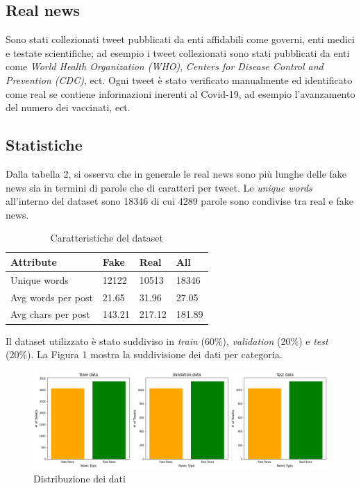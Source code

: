 \documentclass{article}
\begin{document}
\subsection{Real news}
Sono stati collezionati tweet pubblicati da enti affidabili come governi, enti medici e testate scientifiche; ad esempio i tweet collezionati sono stati pubblicati da enti come \textit{World Health Organization (WHO)}, \textit{Centers for Disease Control and Prevention (CDC)}, ect. Ogni tweet è stato verificato manualmente ed identificato come real se contiene informazioni inerenti al Covid-19, ad esempio l'avanzamento del numero dei vaccinati, ect.

\subsection{Statistiche}

Dalla tabella 2, si osserva che in generale le real news sono più lunghe delle fake news sia in termini di parole che di caratteri per tweet. Le \textit{unique words} all'interno del dataset sono 18346 di cui 4289 parole sono condivise tra real e fake news.

\begin{table}[h]
\begin{center}
\begin{tabular}{| l | l | l | l |}
\hline
\textbf{Attribute} & \textbf{Fake} & \textbf{Real}  & \textbf{All}  \\
\hline
Unique words & 12122 & 10513 & 18346 \\
\hline
Avg words per post & 21.65 & 31.96 & 27.05 \\
\hline
Avg chars per post & 143.21 & 217.12 & 181.89 \\
\hline
\end{tabular}
\end{center}
\caption{Caratteristiche del dataset}
\end{table}

\noindent
Il dataset utilizzato è stato suddiviso in \textit{train} (60\%), \textit{validation} (20\%) e \textit{test} (20\%). La Figura 1 mostra la suddivisione dei dati per categoria.

\begin{figure}[H]
\includegraphics[width=1\linewidth]{dataset.png}
\centering
\caption{Distribuzione dei dati}
\label{fig:bytepost}
\end{figure}
\end{document}
